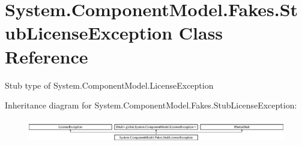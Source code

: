 \hypertarget{class_system_1_1_component_model_1_1_fakes_1_1_stub_license_exception}{\section{System.\-Component\-Model.\-Fakes.\-Stub\-License\-Exception Class Reference}
\label{class_system_1_1_component_model_1_1_fakes_1_1_stub_license_exception}
}


Stub type of System.\-Component\-Model.\-License\-Exception 


Inheritance diagram for System.\-Component\-Model.\-Fakes.\-Stub\-License\-Exception\-:\begin{figure}[H]
\begin{center}
\leavevmode
\includegraphics[height=1.051643cm]{class_system_1_1_component_model_1_1_fakes_1_1_stub_license_exception}
\end{center}
\end{figure}
